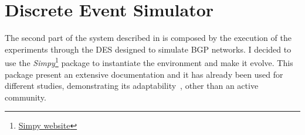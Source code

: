 \section{Discrete Event Simulator}
\label{sec:exp_des}

The second part of the system described in  is composed by
the execution of the experiments through the \ac{DES} designed to simulate
\ac{BGP} networks.
I decided to use the \textit{Simpy}\footnote{\href{https://simpy.readthedocs.io/en/latest/index.html}{Simpy website}}
package to instantiate the environment and make it evolve.
This package present an extensive documentation and it has already been used for different
studies, demonstrating its adaptability~\cite{matloff2008introduction,dagkakis2013manpy},
other than an active community.

%        

%

